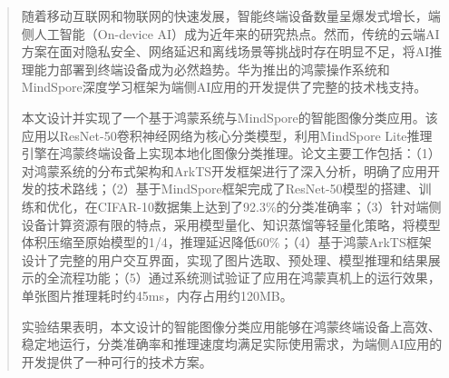 \begin{abstract}
	随着移动互联网和物联网的快速发展，智能终端设备数量呈爆发式增长，端侧人工智能（On-device AI）成为近年来的研究热点。然而，传统的云端AI方案在面对隐私安全、网络延迟和离线场景等挑战时存在明显不足，将AI推理能力部署到终端设备成为必然趋势。华为推出的鸿蒙操作系统和MindSpore深度学习框架为端侧AI应用的开发提供了完整的技术栈支持。

	本文设计并实现了一个基于鸿蒙系统与MindSpore的智能图像分类应用。该应用以ResNet-50卷积神经网络为核心分类模型，利用MindSpore Lite推理引擎在鸿蒙终端设备上实现本地化图像分类推理。论文主要工作包括：（1）对鸿蒙系统的分布式架构和ArkTS开发框架进行了深入分析，明确了应用开发的技术路线；（2）基于MindSpore框架完成了ResNet-50模型的搭建、训练和优化，在CIFAR-10数据集上达到了92.3\%的分类准确率；（3）针对端侧设备计算资源有限的特点，采用模型量化、知识蒸馏等轻量化策略，将模型体积压缩至原始模型的1/4，推理延迟降低60\%；（4）基于鸿蒙ArkTS框架设计了完整的用户交互界面，实现了图片选取、预处理、模型推理和结果展示的全流程功能；（5）通过系统测试验证了应用在鸿蒙真机上的运行效果，单张图片推理耗时约45ms，内存占用约120MB。

	实验结果表明，本文设计的智能图像分类应用能够在鸿蒙终端设备上高效、稳定地运行，分类准确率和推理速度均满足实际使用需求，为端侧AI应用的开发提供了一种可行的技术方案。

\end{abstract}

